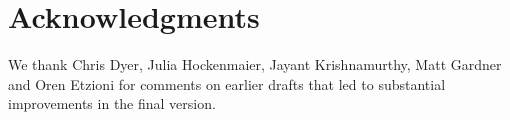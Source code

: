 \documentclass[11pt,a4paper]{article}
\begin{document}
\section*{Acknowledgments}
We thank Chris Dyer, Julia Hockenmaier, Jayant Krishnamurthy, Matt Gardner and Oren Etzioni for comments on earlier drafts that led to substantial improvements in the final version.  



\end{document}
